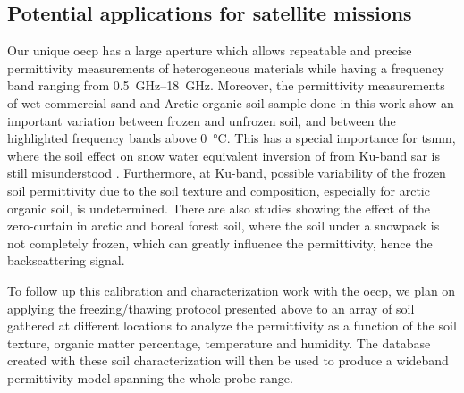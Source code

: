 \subsection{Potential applications for satellite missions}
Our unique \acl{oecp} has a large aperture which allows repeatable and precise permittivity measurements of heterogeneous materials while having a frequency band ranging from \qtyrange{0.5}{18}{\giga\hertz}.
Moreover, the permittivity measurements of wet commercial sand and Arctic organic soil sample done in this work show an important variation between frozen and unfrozen soil, and between the highlighted frequency bands above  \qty{0}{\degreeCelsius}.
This has a special importance for \ac{tsmm}, where the soil effect on snow water equivalent inversion of from Ku-band \ac{sar} is still misunderstood \parencite{King2018,Rutter2019}.
Furthermore, at Ku-band, possible variability of the frozen soil permittivity due to the soil texture and composition, especially for arctic organic soil, is undetermined.
There are also studies showing the effect of the zero-curtain \parencite{Outcalt1990,Domine2018} in arctic and boreal forest soil, where the soil under a snowpack is not completely frozen, which can greatly influence the permittivity, hence the backscattering signal.

To follow up this calibration and characterization work with the \ac{oecp}, we plan on applying the freezing/thawing protocol presented above to an array of soil gathered at different locations to analyze the permittivity as a function of the soil texture, organic matter percentage, temperature and humidity.
The database created with these soil characterization will then be used to produce a wideband permittivity model spanning the whole probe range.
